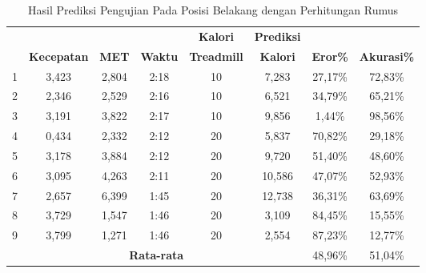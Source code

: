 \begin{longtable}{|c|c|c|c|c|c|c|c|}
  \caption{Hasil Prediksi Pengujian Pada Posisi Belakang dengan Perhitungan Rumus}
  \label{tb:PengujianPosisiBelakangAnalisaPrediksiPerhitungan}                                   \\
  \hline
  \rowcolor[HTML]{C0C0C0}
  & & & & \textbf{Kalori} & \textbf{Prediksi} & & \\
  \rowcolor[HTML]{C0C0C0}
  \multirow{-2}{*}{\textbf{Percobaan}} & \multirow{-2}{*}{\textbf{Kecepatan}} & \multirow{-2}{*}{\textbf{MET}} & \multirow{-2}{*}{\textbf{Waktu}} & \textbf{Treadmill} & \textbf{Kalori} & \multirow{-2}{*}{\textbf{Eror\%}} & \multirow{-2}{*}{\textbf{Akurasi\%}} \\
  \hline
  1   & 3,423   & 2,804    & 2:18    & 10   & 7,283    & 27,17\%      & 72,83\%   \\
  \hline
  2   & 2,346   & 2,529    & 2:16    & 10   & 6,521    & 34,79\%      & 65,21\%   \\
  \hline
  3   & 3,191   & 3,822    & 2:17    & 10   & 9,856    & 1,44\%       & 98,56\%   \\
  \hline
  4   & 0,434   & 2,332    & 2:12    & 20   & 5,837    & 70,82\%      & 29,18\%   \\
  \hline
  5   & 3,178   & 3,884    & 2:12    & 20   & 9,720    & 51,40\%      & 48,60\%   \\
  \hline
  6   & 3,095   & 4,263    & 2:11    & 20   & 10,586   & 47,07\%      & 52,93\%   \\
  \hline
  7   & 2,657   & 6,399    & 1:45    & 20   & 12,738   & 36,31\%      & 63,69\%   \\
  \hline
  8   & 3,729   & 1,547    & 1:46    & 20   & 3,109    & 84,45\%      & 15,55\%   \\
  \hline
  9   & 3,799   & 1,271    & 1:46    & 20   & 2,554    & 87,23\%      & 12,77\%   \\
  \hline

  \multicolumn{6}{|c|}{\textbf{Rata-rata}} & 48,96\% & 51,04\%  \\
  \hline
\end{longtable}

